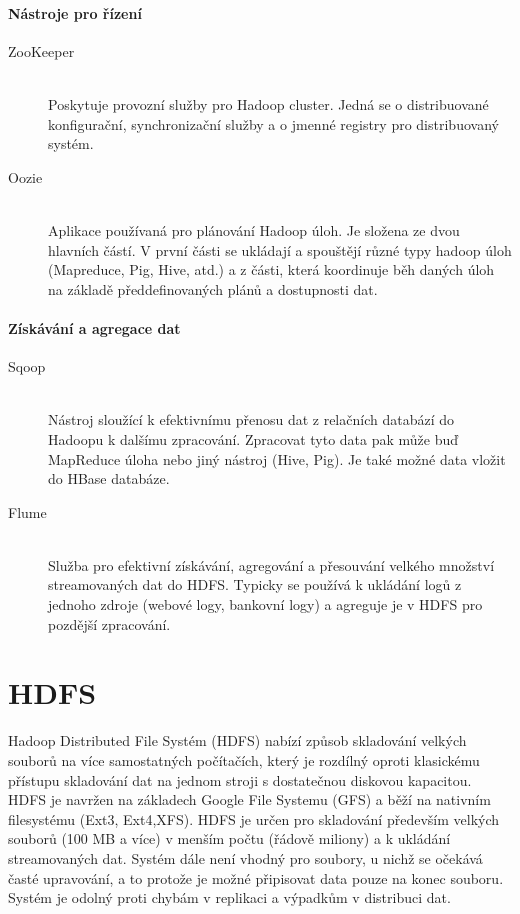 \documentclass[thesis=M,czech]{FITthesis}[2012/06/26]
\begin{document}
\paragraph{Nástroje pro řízení}
\begin{description}
\item[ZooKeeper] \hfill \\
Poskytuje provozní služby pro Hadoop cluster. Jedná se o distribuované konfigurační, synchronizační služby a o jmenné registry pro distribuovaný systém. 

\item[Oozie] \hfill \\
Aplikace používaná pro plánování Hadoop úloh. Je složena ze dvou hlavních částí. V první části se ukládají a spouštějí různé typy hadoop úloh (Mapreduce, Pig, Hive, atd.) a z části, která koordinuje běh daných úloh na základě předdefinovaných plánů a dostupnosti dat.
\end{description}

\paragraph{Získávání a agregace dat}
\begin{description}
\item[Sqoop] \hfill \\
Nástroj sloužící k efektivnímu přenosu dat z relačních databází do Hadoopu k dalšímu zpracování. Zpracovat tyto data pak může buď MapReduce úloha nebo jiný nástroj (Hive, Pig). Je také možné data vložit do HBase databáze.
\item[Flume] \hfill \\
Služba pro efektivní získávání, agregování a přesouvání velkého množství streamovaných dat do HDFS. Typicky se používá k ukládání logů z jednoho zdroje (webové logy, bankovní logy) a agreguje je v HDFS pro pozdější zpracování.
\end{description}

\section{HDFS}
Hadoop Distributed File Systém (HDFS) nabízí způsob skladování velkých souborů na více samostatných počítačích, který je rozdílný oproti klasickému přístupu skladování dat na jednom stroji s dostatečnou diskovou kapacitou. HDFS je navržen na základech Google File Systemu (GFS) a běží na nativním filesystému (Ext3, Ext4,XFS). HDFS je určen pro skladování především velkých souborů (100 MB a více) v menším počtu (řádově miliony) a k ukládání streamovaných dat. Systém dále není vhodný pro soubory, u nichž se očekává časté upravování, a to protože je možné připisovat data pouze na konec souboru. Systém je odolný proti chybám v replikaci a výpadkům v distribuci dat.\cite{HDFSWEB}
\end{document}
